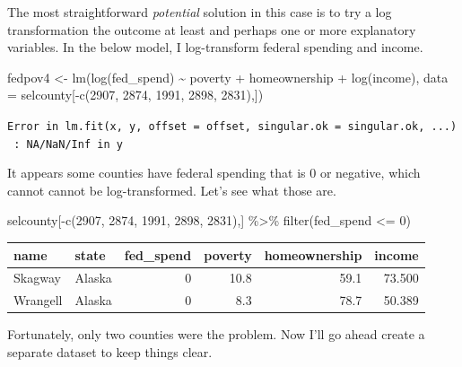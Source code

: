 \documentclass[
]{book}
\makeatletter
\newenvironment{Shaded}{\begin{snugshade}}{\end{snugshade}}
\newcommand{\AttributeTok}[1]{\textcolor[rgb]{0.61,0.61,0.61}{#1}}
\newcommand{\DecValTok}[1]{\textcolor[rgb]{0.06,0.06,0.06}{#1}}
\newcommand{\FunctionTok}[1]{\textcolor[rgb]{0,0,0}{#1}}
\newcommand{\NormalTok}[1]{#1}
\newcommand{\OtherTok}[1]{\textcolor[rgb]{0.37,0.37,0.37}{#1}}
\newcommand{\SpecialCharTok}[1]{\textcolor[rgb]{0,0,0}{#1}}
\newenvironment{kframe}{%
\medskip{}
\setlength{\fboxsep}{.8em}
 \def\at@end@of@kframe{}%
 \ifinner\ifhmode%
  \def\at@end@of@kframe{\end{minipage}}%
  \begin{minipage}{\columnwidth}%
 \fi\fi%
 \def\FrameCommand##1{\hskip\@totalleftmargin \hskip-\fboxsep
 \colorbox{shadecolor}{##1}\hskip-\fboxsep
     \hskip-\linewidth \hskip-\@totalleftmargin \hskip\columnwidth}%
 \MakeFramed {\advance\hsize-\width
   \@totalleftmargin\z@ \linewidth\hsize
   \@setminipage}}%
 {\par\unskip\endMakeFramed%
 \at@end@of@kframe}
\renewenvironment{Shaded}{\begin{kframe}}{\end{kframe}}
\makeatother
\begin{document}
The most straightforward \emph{potential} solution in this case is to try a log transformation the outcome at least and perhaps one or more explanatory variables. In the below model, I log-transform federal spending and income.

\begin{Shaded}
\begin{Highlighting}[]
\NormalTok{fedpov4 }\OtherTok{\textless{}{-}} \FunctionTok{lm}\NormalTok{(}\FunctionTok{log}\NormalTok{(fed\_spend) }\SpecialCharTok{\textasciitilde{}}\NormalTok{ poverty }\SpecialCharTok{+}\NormalTok{ homeownership }\SpecialCharTok{+} \FunctionTok{log}\NormalTok{(income), }
              \AttributeTok{data =}\NormalTok{ selcounty[}\SpecialCharTok{{-}}\FunctionTok{c}\NormalTok{(}\DecValTok{2907}\NormalTok{, }\DecValTok{2874}\NormalTok{, }\DecValTok{1991}\NormalTok{, }\DecValTok{2898}\NormalTok{, }\DecValTok{2831}\NormalTok{),])}
\end{Highlighting}
\end{Shaded}

\texttt{Error\ in\ lm.fit(x,\ y,\ offset\ =\ offset,\ singular.ok\ =\ singular.ok,\ ...)\ :\ NA/NaN/Inf\ in\ \textquotesingle{}y\textquotesingle{}}

It appears some counties have federal spending that is 0 or negative, which cannot cannot be log-transformed. Let's see what those are.

\begin{Shaded}
\begin{Highlighting}[]
\NormalTok{selcounty[}\SpecialCharTok{{-}}\FunctionTok{c}\NormalTok{(}\DecValTok{2907}\NormalTok{, }\DecValTok{2874}\NormalTok{, }\DecValTok{1991}\NormalTok{, }\DecValTok{2898}\NormalTok{, }\DecValTok{2831}\NormalTok{),] }\SpecialCharTok{\%\textgreater{}\%} 
  \FunctionTok{filter}\NormalTok{(fed\_spend }\SpecialCharTok{\textless{}=} \DecValTok{0}\NormalTok{)}
\end{Highlighting}
\end{Shaded}

\begin{tabular}{l|l|r|r|r|r}
\hline
name & state & fed\_spend & poverty & homeownership & income\\
\hline
Skagway & Alaska & 0 & 10.8 & 59.1 & 73.500\\
\hline
Wrangell & Alaska & 0 & 8.3 & 78.7 & 50.389\\
\hline
\end{tabular}

Fortunately, only two counties were the problem. Now I'll go ahead create a separate dataset to keep things clear.
\end{document}
